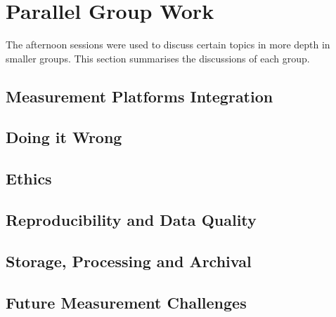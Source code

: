 \section{Parallel Group Work}\label{sec:parallel-group-work}

The afternoon sessions were used to discuss certain topics in more depth in
smaller groups. This section summarises the discussions of each group.

\subsection{Measurement Platforms Integration}


\subsection{Doing it Wrong}


\subsection{Ethics}


\subsection{Reproducibility and Data Quality}


\subsection{Storage, Processing and Archival}


\subsection{Future Measurement Challenges}

